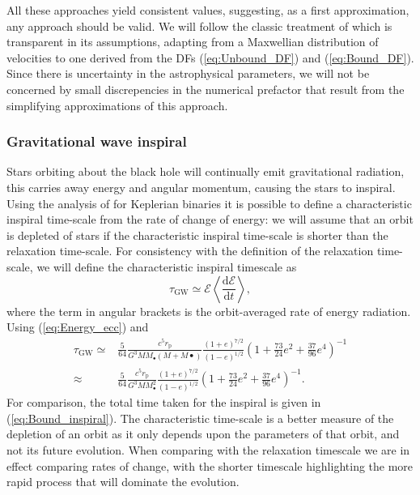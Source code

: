 \documentclass[useAMS,usedcolumn,usegraphicx,usenatbib]{mn2e}
\newcommand{\eqnref}[1]{(\ref{eq:#1})}
\newcommand{\sub}[1]{\ensuremath{_\mathrm{#1}}}
\newcommand{\dd}{\ensuremath{\mathrm{d}}}
\newcommand{\diff}[2]{\ensuremath{\frac{\dd {#1}}{\dd {#2}}}}
\begin{document}
All these approaches yield consistent values, suggesting, as a first approximation, any approach should be valid. We will follow the classic treatment of \citet[chapter 2]{Chandrasekhar1960} which is transparent in its assumptions, adapting from a Maxwellian distribution of velocities to one derived from the DFs \eqnref{Unbound_DF} and \eqnref{Bound_DF}. Since there is uncertainty in the astrophysical parameters, we will not be concerned by small discrepencies in the numerical prefactor that result from the simplifying approximations of this approach.

\subsubsection{Gravitational wave inspiral}

Stars orbiting about the black hole will continually emit gravitational radiation, this carries away energy and angular momentum, causing the stars to inspiral. Using the analysis of \citet{Peters1963,Peters1964} for Keplerian binaries it is possible to define a characteristic inspiral time-scale from the rate of change of energy: we will assume that an orbit is depleted of stars if the characteristic inspiral time-scale is shorter than the relaxation time-scale. For consistency with the definition of the relaxation time-scale, we will define the characteristic inspiral timescale as
\begin{equation}
\tau\sub{GW} \simeq \mathcal{E}\left\langle\diff{\mathcal{E}}{t}\right\rangle,
\end{equation}
where the term in angular brackets is the orbit-averaged rate of energy radiation. Using \eqnref{Energy_ecc} and \citet{Peters1963}
\begin{align}
\tau\sub{GW} \simeq {} & \frac{5}{64}\frac{c^5r\sub{p}}{G^3MM_\bullet\left(M + M\bullet\right)}\frac{(1+e)^{7/2}}{(1-e)^{1/2}}\left(1+\frac{73}{24}e^2 + \frac{37}{96}e^4\right)^{-1} \\
 \approx {} & \frac{5}{64}\frac{c^5r\sub{p}}{G^3MM_\bullet^2}\frac{(1+e)^{7/2}}{(1-e)^{1/2}}\left(1+\frac{73}{24}e^2 + \frac{37}{96}e^4\right)^{-1}.
\end{align}
For comparison, the total time taken for the inspiral is given in \eqnref{Bound_inspiral}. The characteristic time-scale is a better measure of the depletion of an orbit as it only depends upon the parameters of that orbit, and not its future evolution. When comparing with the relaxation timescale we are in effect comparing rates of change, with the shorter timescale highlighting the more rapid process that will dominate the evolution.
\end{document}
